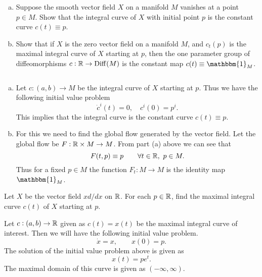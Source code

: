 \begin{problem}
	$ \ $
	\begin{enumerate}[(a)]
		\item Suppose the smooth vector field $ X $ on a manifold $ M $ vanishes at a point $ p \in M $. Show that the integral curve of $ X $ with initial point $ p $ is the constant curve $ c(t) \equiv p $.
		\item Show that if $ X $ is the zero vector field on a manifold $ M $, and $ c_t(p) $ is the maximal integral curve of $ X $ starting at $ p $, then the one parameter group of diffeomorphisms $ c: \mathbb{R} \to \operatorname{Diff}(M) $ is the constant map $ c(t) \equiv \mathbbm{1}_M $.
	\end{enumerate}
\end{problem}
\begin{solution}
	$ \ $
	\begin{enumerate}[(a)]
		\item 	Let $ c: (a,b) \to M $ be the integral curve of $ X $ starting at $ p $. Thus we have the following initial value problem
		\[ \dot{c}^i(t) = 0, \quad c^i(0) = p^i. \]
		This implies that the integral curve is the constant curve $ c(t) \equiv p $.
		\item For this we need to find the global flow generated by the vector field. Let the global flow be $ F: \mathbb{R} \times M \to M $. From part (a) above we can see that 
		\[ F(t,p) \equiv p \qquad \forall t \in \mathbb{R},\ p \in M. \]
		Thus for a fixed $ p \in M $ the function $ F_t: M \to M $ is the identity map $ \mathbbm{1}_M $.
	\end{enumerate}
\end{solution}

\begin{problem}
	Let $ X $ be the vector field $ x d/dx $ on $ \mathbb{R} $. For each $ p \in \mathbb{R} $, find the maximal integral curve $ c(t) $ of $ X $ starting at $ p $.
\end{problem}
\begin{solution}
	Let $ c: (a,b) \to \mathbb{R}$ given as $ c(t) = x(t) $ be the maximal integral curve of interest. Then we will have the following initial value problem.
	\[ \dot{x} = x, \qquad x(0) = p.\]
	The solution of the initial value problem above is given as
	\[ x(t) = p e^t. \]
	The maximal domain of this curve is given as $ (-\infty,\infty) $.
\end{solution}

